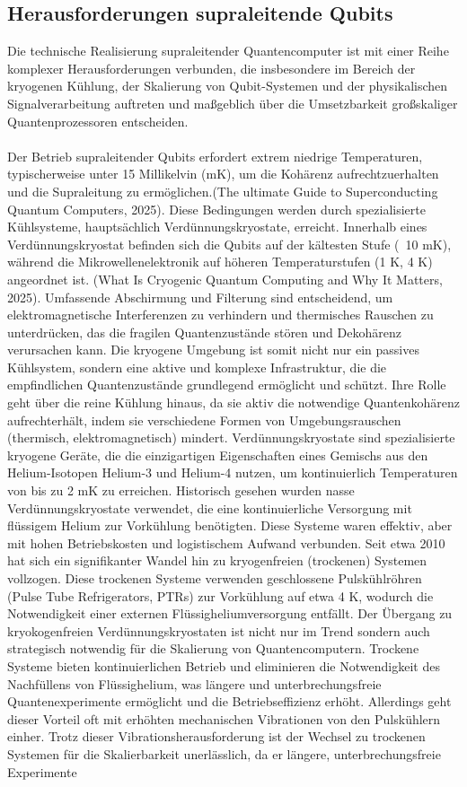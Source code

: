 \subsection{Herausforderungen supraleitende Qubits}
Die technische Realisierung supraleitender Quantencomputer ist mit einer Reihe komplexer Herausforderungen verbunden, die insbesondere im Bereich der kryogenen Kühlung, der Skalierung von Qubit-Systemen und der physikalischen Signalverarbeitung auftreten und maßgeblich über die Umsetzbarkeit großskaliger Quantenprozessoren entscheiden.
\\\\
Der Betrieb supraleitender Qubits erfordert extrem niedrige Temperaturen, typischerweise unter 15 Millikelvin (mK), um die Kohärenz aufrechtzuerhalten und die Supraleitung zu ermöglichen.(The ultimate Guide to Superconducting Quantum Computers, 2025). Diese Bedingungen werden durch spezialisierte Kühlsysteme, hauptsächlich Verdünnungskryostate, erreicht. Innerhalb eines Verdünnungskryostat befinden sich die Qubits auf der kältesten Stufe (~10 mK), während die Mikrowellenelektronik auf höheren Temperaturstufen (1 K, 4 K) angeordnet ist. (What Is Cryogenic Quantum Computing and Why It Matters, 2025). Umfassende Abschirmung und Filterung sind entscheidend, um elektromagnetische Interferenzen zu verhindern und thermisches Rauschen zu unterdrücken, das die fragilen Quantenzustände stören und Dekohärenz verursachen kann. Die kryogene Umgebung ist somit nicht nur ein passives Kühlsystem, sondern eine aktive und komplexe Infrastruktur, die die empfindlichen Quantenzustände grundlegend ermöglicht und schützt. Ihre Rolle geht über die reine Kühlung hinaus, da sie aktiv die notwendige Quantenkohärenz aufrechterhält, indem sie verschiedene Formen von Umgebungsrauschen (thermisch, elektromagnetisch) mindert. Verdünnungskryostate sind spezialisierte kryogene Geräte, die die einzigartigen Eigenschaften eines Gemischs aus den Helium-Isotopen Helium-3 und Helium-4 nutzen, um kontinuierlich Temperaturen von bis zu 2 mK zu erreichen. Historisch gesehen wurden \grqq nasse\grqq{} Verdünnungskryostate verwendet, die eine kontinuierliche Versorgung mit flüssigem Helium zur Vorkühlung benötigten. Diese Systeme waren effektiv, aber mit hohen Betriebskosten und logistischem Aufwand verbunden. Seit etwa 2010 hat sich ein signifikanter Wandel hin zu kryogenfreien (\grqq trockenen\grqq{}) Systemen vollzogen. Diese trockenen Systeme verwenden geschlossene Pulskühlröhren (Pulse Tube Refrigerators, PTRs) zur Vorkühlung auf etwa 4 K, wodurch die Notwendigkeit einer externen Flüssigheliumversorgung entfällt. Der Übergang zu kryokogenfreien Verdünnungskryostaten ist nicht nur im Trend sondern auch strategisch notwendig für die Skalierung von Quantencomputern. Trockene Systeme bieten kontinuierlichen Betrieb und eliminieren die Notwendigkeit des Nachfüllens von Flüssighelium, was längere und unterbrechungsfreie Quantenexperimente ermöglicht und die Betriebseffizienz erhöht. Allerdings geht dieser Vorteil oft mit erhöhten mechanischen Vibrationen von den Pulskühlern einher. Trotz dieser Vibrationsherausforderung ist der Wechsel zu trockenen Systemen für die Skalierbarkeit unerlässlich, da er längere, unterbrechungsfreie Experimente 